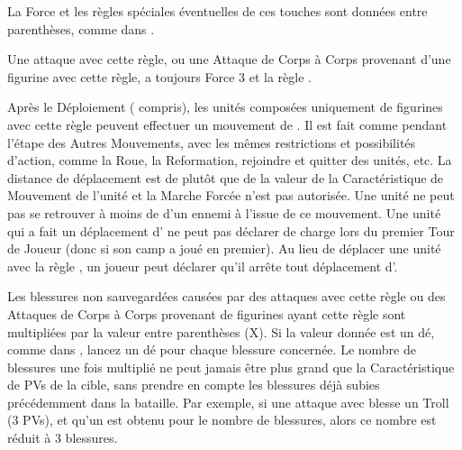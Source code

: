  La Force et les règles spéciales éventuelles de ces touches sont données entre parenthèses, comme dans \og {} \fg{}.


Une attaque avec cette règle, ou une Attaque de Corps à Corps provenant d'une figurine avec cette règle, a toujours Force 3 et la règle .

\newpage
{}

Après le Déploiement (\scouts{} compris), les unités composées uniquement de figurines avec cette règle peuvent effectuer un mouvement de . Il est fait comme pendant l'étape des Autres Mouvements, avec les mêmes restrictions et possibilités d'action, comme la Roue, la Reformation, rejoindre et quitter des unités, etc. La distance de déplacement est de  plutôt que de la valeur de la Caractéristique de Mouvement de l'unité et la Marche Forcée n'est pas autorisée. Une unité ne peut pas se retrouver à moins de  d'un ennemi à l'issue de ce mouvement.  Une unité qui a fait un déplacement d'\vanguard{} ne peut pas déclarer de charge lors du premier Tour de Joueur (donc si son camp a joué en premier).  Au lieu de déplacer une unité avec la règle \vanguard{}, un joueur peut déclarer qu'il arrête tout déplacement d'\vanguard{}.


Les blessures non sauvegardées causées par des attaques avec cette règle ou des Attaques de Corps à Corps provenant de figurines ayant cette règle sont multipliées par la valeur entre parenthèses (X). Si la valeur donnée est un dé, comme dans \og {} \fg{}, lancez un dé pour chaque blessure concernée. Le nombre de blessures une fois multiplié ne peut jamais être plus grand que la Caractéristique de PVs de la cible, sans prendre en compte les blessures déjà subies précédemment dans la bataille. Par exemple, si une attaque avec  blesse un Troll (3 PVs), et qu'un  est obtenu pour le nombre de blessures, alors ce nombre est réduit à 3 blessures.

